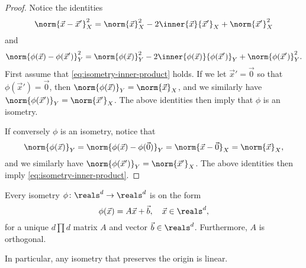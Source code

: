 \documentclass[article, a4paper, 11pt, oneside]{memoir}
\numberwithin{equation}{chapter}
\begin{document}
\begin{proof}
    Notice the identities
    \begin{equation*}
        \norm{\vec{x} - \vec{x}'}_X^2
            = \norm{\vec{x}}_X^2 - 2 \inner{\vec{x}}{\vec{x}'}_X + \norm{\vec{x}'}_X^2
    \end{equation*}
    and
    \begin{equation*}
        \norm{\phi(\vec{x}) - \phi(\vec{x}')}_Y^2
            = \norm{\phi(\vec{x})}_Y^2 - 2 \inner{\phi(\vec{x})}{\phi(\vec{x}')}_Y + \norm{\phi(\vec{x}')}_Y^2.
    \end{equation*}
    First assume that \cref{eq:isometry-inner-product} holds. If we let $\vec{x}' = \vec{0}$ so that $\phi(\vec{x}') = \vec{0}$, then $\norm{\phi(\vec{x})}_Y = \norm{\vec{x}}_X$, and we similarly have $\norm{\phi(\vec{x}')}_Y = \norm{\vec{x}'}_X$. The above identities then imply that $\phi$ is an isometry.
    
    If conversely $\phi$ is an isometry, notice that
    \begin{equation*}
        \norm{\phi(\vec{x})}_Y
            = \norm{\phi(\vec{x}) - \phi(\vec{0})}_Y
            = \norm{\vec{x} - \vec{0}}_X
            = \norm{\vec{x}}_X,
    \end{equation*}
    and we similarly have $\norm{\phi(\vec{x}')}_Y = \norm{\vec{x}'}_X$. The above identities then imply \cref{eq:isometry-inner-product}.
\end{proof}

\begin{proposition}
    \label{prop:isometry-characterisation-Euclidean-space}
    Every isometry $\phi \colon \reals^d \to \reals^d$ is on the form
    \begin{equation*}
        \phi(\vec{x})
            = A \vec{x} + \vec{b}, \quad \vec{x} \in \reals^d,
    \end{equation*}
    for a unique $d \prod d$ matrix $A$ and vector $\vec{b} \in \reals^d$. Furthermore, $A$ is orthogonal.
\end{proposition}
%
In particular, any isometry that preserves the origin is linear.
\end{document}
